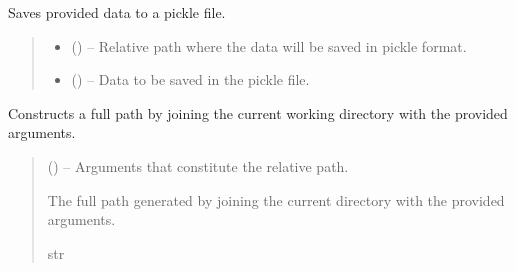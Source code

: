 \documentclass[letterpaper,10pt,english]{sphinxmanual}
\begin{document}
\begin{fulllineitems}
\label{\detokenize{fspsim.utils:fspsim.utils.SpaceCatalogue.dump_pickle}}
\pysigstartsignatures
{}
\pysigstopsignatures
\sphinxAtStartPar
Saves provided data to a pickle file.
\begin{quote}\begin{description}
\begin{itemize}
\item {} 
\sphinxAtStartPar
{} () – Relative path where the data will be saved in pickle format.

\item {} 
\sphinxAtStartPar
{} () – Data to be saved in the pickle file.

\end{itemize}

\end{description}\end{quote}

\end{fulllineitems}


\begin{fulllineitems}
\label{\detokenize{fspsim.utils:fspsim.utils.SpaceCatalogue.get_path}}
\pysigstartsignatures
{}
\pysigstopsignatures
\sphinxAtStartPar
Constructs a full path by joining the current working directory with the provided arguments.
\begin{quote}\begin{description}
\sphinxAtStartPar
{} () – Arguments that constitute the relative path.

\sphinxAtStartPar
The full path generated by joining the current directory with the provided arguments.

\sphinxAtStartPar
str

\end{description}\end{quote}

\end{fulllineitems}
\end{document}
